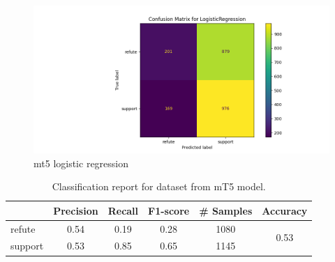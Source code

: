 \begin{figure}[H]
    \centering
    \includegraphics[scale=0.5]{figures/mt5_LogisticRegression.png}
    \caption{mt5 logistic regression}
    \label{fig:mt5_regression}
\end{figure}

\begin{table}[H]
    \centering
    \begin{tabular}{l|ccccc}
        \hline
        & Precision & Recall & F1-score & \# Samples & Accuracy \\
        \hline
        refute & 0.54 & 0.19 & 0.28 & 1080 & \multirow{2}{*}{0.53} \\
        support & 0.53 & 0.85 & 0.65 & 1145 &  \\
        \hline
    \end{tabular}
    \caption{Classification report for dataset from mT5 model.}
    \label{tab:mT5_classification_report}
\end{table}




